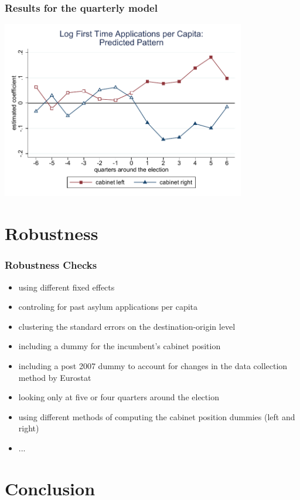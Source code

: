 \documentclass[compress, xcolor = {table,xcdraw}]{beamer}
\begin{document}
\begin{frame} [t]
\frametitle{Results for the quarterly model}
\begin{center}	
	\includegraphics[width=0.8\textwidth] {../paper/inputs/app_graph2_baseline.pdf}	
\end{center}
\end{frame}





\section{Robustness}

\begin{frame}
\frametitle{Robustness Checks}
\begin{itemize}
	\item using different fixed effects
	\item controling for past asylum applications per capita
	\item clustering the standard errors on the destination-origin level
	\item including a dummy for the incumbent's cabinet position
	\item including a post 2007 dummy to account for changes in the data collection method by Eurostat
	\item looking only at five or four quarters around the election 
	\item using different methods of computing the cabinet position dummies (left and right)
	\item ...
\end{itemize}
\end{frame}


\section{Conclusion}
\end{document}
